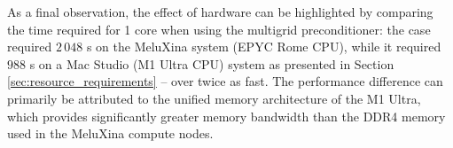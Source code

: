 \documentclass[sn-mathphys,Numbered]{sn-jnl}%
\begin{document}
As a final observation, the effect of hardware can be highlighted by comparing the time required for 1 core when using the multigrid preconditioner: the case required $2\,048$ s on the MeluXina system (EPYC Rome CPU), while it required $988$ s on a Mac Studio (M1 Ultra CPU) system as presented in Section \ref{sec:resource_requirements} -- over twice as fast.
The performance difference can primarily be attributed to the unified memory architecture of the M1 Ultra, which provides significantly greater memory bandwidth than the DDR4 memory used in the MeluXina compute nodes.





\end{document}
